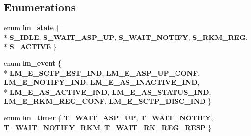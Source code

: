 \subsection*{Enumerations}
\begin{DoxyCompactItemize}
\item 
enum {\bf lm\+\_\+state} \{ \\*
{\bf S\+\_\+\+I\+D\+LE}, 
{\bf S\+\_\+\+W\+A\+I\+T\+\_\+\+A\+S\+P\+\_\+\+UP}, 
{\bf S\+\_\+\+W\+A\+I\+T\+\_\+\+N\+O\+T\+I\+FY}, 
{\bf S\+\_\+\+R\+K\+M\+\_\+\+R\+EG}, 
\\*
{\bf S\+\_\+\+A\+C\+T\+I\+VE}
 \}
\item 
enum {\bf lm\+\_\+event} \{ \\*
{\bf L\+M\+\_\+\+E\+\_\+\+S\+C\+T\+P\+\_\+\+E\+S\+T\+\_\+\+I\+ND}, 
{\bf L\+M\+\_\+\+E\+\_\+\+A\+S\+P\+\_\+\+U\+P\+\_\+\+C\+O\+NF}, 
{\bf L\+M\+\_\+\+E\+\_\+\+N\+O\+T\+I\+F\+Y\+\_\+\+I\+ND}, 
{\bf L\+M\+\_\+\+E\+\_\+\+A\+S\+\_\+\+I\+N\+A\+C\+T\+I\+V\+E\+\_\+\+I\+ND}, 
\\*
{\bf L\+M\+\_\+\+E\+\_\+\+A\+S\+\_\+\+A\+C\+T\+I\+V\+E\+\_\+\+I\+ND}, 
{\bf L\+M\+\_\+\+E\+\_\+\+A\+S\+\_\+\+S\+T\+A\+T\+U\+S\+\_\+\+I\+ND}, 
{\bf L\+M\+\_\+\+E\+\_\+\+R\+K\+M\+\_\+\+R\+E\+G\+\_\+\+C\+O\+NF}, 
{\bf L\+M\+\_\+\+E\+\_\+\+S\+C\+T\+P\+\_\+\+D\+I\+S\+C\+\_\+\+I\+ND}
 \}
\item 
enum {\bf lm\+\_\+timer} \{ {\bf T\+\_\+\+W\+A\+I\+T\+\_\+\+A\+S\+P\+\_\+\+UP}, 
{\bf T\+\_\+\+W\+A\+I\+T\+\_\+\+N\+O\+T\+I\+FY}, 
{\bf T\+\_\+\+W\+A\+I\+T\+\_\+\+N\+O\+T\+I\+F\+Y\+\_\+\+R\+KM}, 
{\bf T\+\_\+\+W\+A\+I\+T\+\_\+\+R\+K\+\_\+\+R\+E\+G\+\_\+\+R\+E\+SP}
 \}
\end{DoxyCompactItemize}

